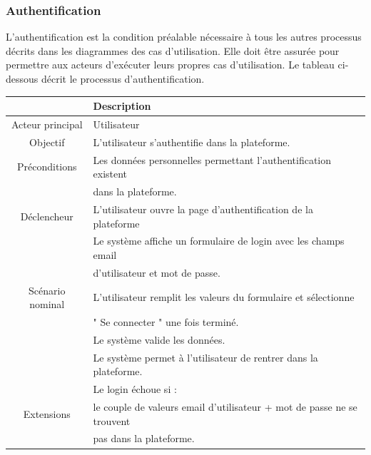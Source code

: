 \subsubsection{	Authentification}
\hspace{4mm}L’authentification est la condition préalable nécessaire à tous les autres processus décrits dans les diagrammes des cas d’utilisation. Elle doit être assurée pour permettre aux acteurs d’exécuter leurs propres cas d’utilisation. Le tableau ci-dessous décrit le processus d'authentification.
\begin{center}
\begin{tabular}{|c|l|}
\hline 
&\textbf { Description }\\\hline 
    Acteur principal & Utilisateur \\\hline 
    Objectif&L’utilisateur s’authentifie dans la plateforme.\\\hline
    Préconditions&Les données personnelles permettant l’authentification existent \\&dans la plateforme.\\\hline 
    Déclencheur&L’utilisateur ouvre la page d’authentification de la plateforme\\\hline 
    &Le système affiche un formulaire de login avec les champs email \\&d’utilisateur et mot de passe.\\
    Scénario nominal&L’utilisateur remplit les valeurs du formulaire et sélectionne \\&" Se connecter " une fois terminé.\\& Le système valide les données.\\
    &Le système permet à l’utilisateur de rentrer dans la plateforme.\\\hline
    &Le login échoue si : \\
    Extensions&le couple de valeurs email d’utilisateur + mot de passe ne se trouvent \\
    &pas dans la plateforme.\\\hline
\end{tabular}
\label{desc_auth}
\end{center}\newpage

